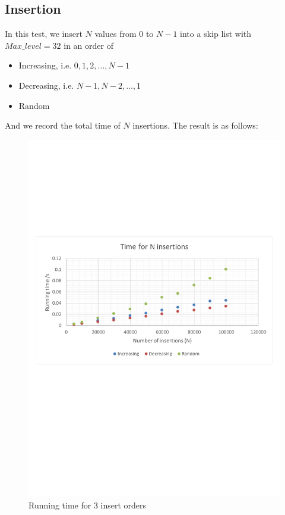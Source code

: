 \subsection{Insertion}
In this test, we insert $N$ values from $0$ to $N-1$ into a skip list with $Max\_level=32$ in an order of
\begin{itemize}
    \item Increasing, i.e. $0,1,2,\ldots,N-1$
    \item Decreasing, i.e. $N-1,N-2,\ldots,1$
    \item Random
\end{itemize}
And we record the total time of $N$ insertions. The result is as follows:
\begin{figure}[H]
    \centering
    \includegraphics[width=\textwidth]{testing_results/insert.pdf}
    \caption{Running time for 3 insert orders}
\end{figure}

